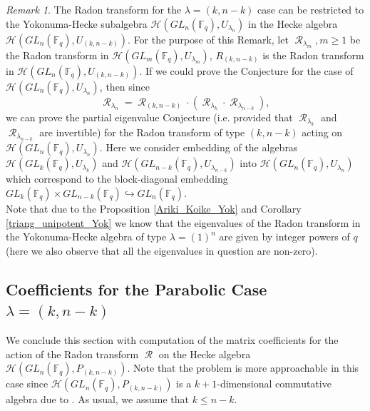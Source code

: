 \documentclass[12pt,reqno]{amsart}
\theoremstyle{definition}
\theoremstyle{remark}
\newtheorem{rem}[thm]{Remark}
\numberwithin{equation}{section}
\newcommand{\GL}[1]{GL_{#1}(\mathbb{F}_q)}
\DeclareMathOperator{\R}{\mathcal{R}}
\begin{document}
\begin{rem}
    The Radon transform for the $\lambda=(k,n-k)$ case can be restricted to the Yokonuma-Hecke subalgebra $\mathcal{H}(\GL{n},U_{\lambda_n})$ in the Hecke algebra $\mathcal{H}(\GL{n},U_{(k,n-k)})$. For the purpose of this Remark, let $\R_{\lambda_m},m\ge 1$ be the Radon transform in $\mathcal{H}(\GL{m},U_{\lambda_m})$, $R_{(k,n-k)}$ is the Radon transform in $\mathcal{H}(\GL{n},U_{(k,n-k)})$. If we could prove the Conjecture for the case of $\mathcal{H}(\GL{n},U_{\lambda_n})$, then since
    \begin{equation}\label{block_triang}
        \R_{\lambda_n} = \R_{(k,n-k)} \cdot (\R_{\lambda_k} \cdot \R_{\lambda_{n-k}}),
    \end{equation}
    we can prove the partial eigenvalue Conjecture (i.e. provided that $\R_{\lambda_k}$ and $\R_{\lambda_{n-k}}$ are invertible) for the Radon transform of type $(k,n-k)$ acting on $\mathcal{H}(\GL{n},U_{\lambda_n})$. Here we consider embedding of the algebras $\mathcal{H}(\GL{k},U_{\lambda_k})$ and $\mathcal{H}(\GL{n-k},U_{\lambda_{n-k}})$ into $\mathcal{H}(\GL{n},U_{\lambda_n})$ which correspond to the block-diagonal embedding $\GL{k}\times \GL{n-k}\hookrightarrow \GL{n}$.\\

    Note that due to the Proposition \ref{Ariki_Koike_Yok} and Corollary \ref{triang_unipotent_Yok} we know that the eigenvalues of the Radon transform in the Yokonuma-Hecke algebra of type $\lambda=(1)^n$ are given by integer powers of $q$ (here we also observe that all the eigenvalues in question are non-zero).
\end{rem}



\subsection{Coefficients for the Parabolic Case $\lambda=(k,n-k)$}
We conclude this section with computation of the matrix coefficients for the action of the Radon transform $\R$ on the Hecke algebra $\mathcal{H}(\GL{n}, P_{(k,n-k)})$. Note that the problem is more approachable in this case since $\mathcal{H}(\GL{n},P_{(k,n-k)})$ is a $k+1$-dimensional commutative algebra due to \cite[Theorem 3.1]{CIK}. As usual, we assume that $k\le n-k$.\\
\end{document}
